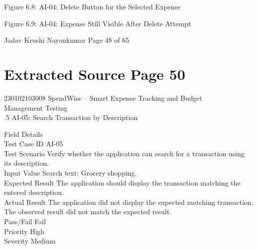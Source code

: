 \documentclass[12pt,a4paper]{report}
\begin{document}
\smallskip

\smallskip

\smallskip
Figure 6.8: AI-04: Delete Button for the Selected Expense\\ 

\smallskip

\smallskip

\smallskip

\smallskip
Figure 6.9: AI-04: Expense Still Visible After Delete Attempt\\ 

\smallskip

\smallskip

\smallskip

\smallskip
Jadav Krushi Nayankumar                                                          Page 48 of 65\\ 

\clearpage
\section*{Extracted Source Page 50}
230102103008                           SpendWise – Smart Expense Tracking and Budget\\ 
Management Testing\\ 

.5 AI-05: Search Transaction by Description\\ 

\smallskip

\smallskip
Field                   Details\\ 
Test Case ID            AI-05\\ 
Test Scenario           Verify whether the application can search for a transaction using\\ 
its description.\\ 
Input Value             Search text: Grocery shopping.\\ 
Expected Result         The application should display the transaction matching the\\ 
entered description.\\ 
Actual Result           The application did not display the expected matching transaction.\\ 
The observed result did not match the expected result.\\ 
Pass/Fail               Fail\\ 
Priority                High\\ 
Severity                Medium\\ 
\end{document}
